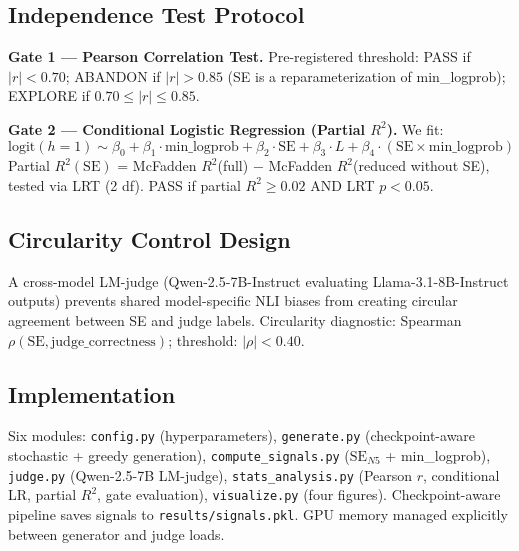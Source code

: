 \subsection{Independence Test Protocol}

\textbf{Gate 1 --- Pearson Correlation Test.} Pre-registered threshold: PASS if $|r| < 0.70$; ABANDON if $|r| > 0.85$ (SE is a reparameterization of min\_logprob); EXPLORE if $0.70 \leq |r| \leq 0.85$.

\textbf{Gate 2 --- Conditional Logistic Regression (Partial $R^2$).} We fit:
\[
\text{logit}(h=1) \sim \beta_0 + \beta_1 \cdot \text{min\_logprob} + \beta_2 \cdot \text{SE} + \beta_3 \cdot L + \beta_4 \cdot (\text{SE} \times \text{min\_logprob})
\]
Partial $R^2(\text{SE})$ = McFadden $R^2$(full) $-$ McFadden $R^2$(reduced without SE), tested via LRT (2 df). PASS if partial $R^2 \geq 0.02$ AND LRT $p < 0.05$.

\subsection{Circularity Control Design}

A cross-model LM-judge (Qwen-2.5-7B-Instruct evaluating Llama-3.1-8B-Instruct outputs) prevents shared model-specific NLI biases from creating circular agreement between SE and judge labels. Circularity diagnostic: Spearman $\rho(\text{SE}, \text{judge\_correctness})$; threshold: $|\rho| < 0.40$.

\subsection{Implementation}

Six modules: \texttt{config.py} (hyperparameters), \texttt{generate.py} (checkpoint-aware stochastic + greedy generation), \texttt{compute\_signals.py} ($\text{SE}_{N5}$ + min\_logprob), \texttt{judge.py} (Qwen-2.5-7B LM-judge), \texttt{stats\_analysis.py} (Pearson $r$, conditional LR, partial $R^2$, gate evaluation), \texttt{visualize.py} (four figures). Checkpoint-aware pipeline saves signals to \texttt{results/signals.pkl}. GPU memory managed explicitly between generator and judge loads.
